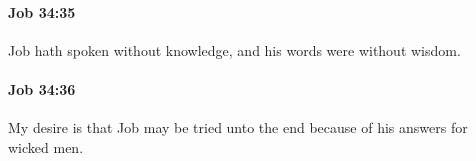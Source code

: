 		\paragraph{Job 34:35} %
			\label{JOB-34-35}

			Job hath spoken without knowledge, and his words were without wisdom.


		\paragraph{Job 34:36} %
			\label{JOB-34-36}

			My desire is that Job may be tried unto the end because of his answers for wicked men.


